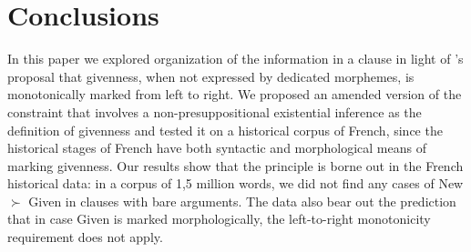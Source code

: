\documentclass[output=paper,modfonts,nonflat]{langsci/langscibook}
\begin{document}



\section{Conclusions} 
\label{section:conclusions}



In this paper we explored organization of the information in a clause in light of \citet{Kucerova:2012}'s proposal that givenness, when not expressed by dedicated morphemes, is monotonically marked from left to right. We proposed an amended version of the constraint that involves a non-presuppositional existential inference as the definition of givenness and tested it on a historical corpus of French, since the historical stages of French have both syntactic and \linebreak morphological means of marking givenness. Our results show that the principle is borne out in the French historical data: in a corpus of 1,5 million words, we did not find any cases of New $\succ$ Given in clauses with bare arguments. The data also bear out the prediction that in case Given is marked morphologically, the left-to-right monotonicity requirement does not apply.
\end{document}
